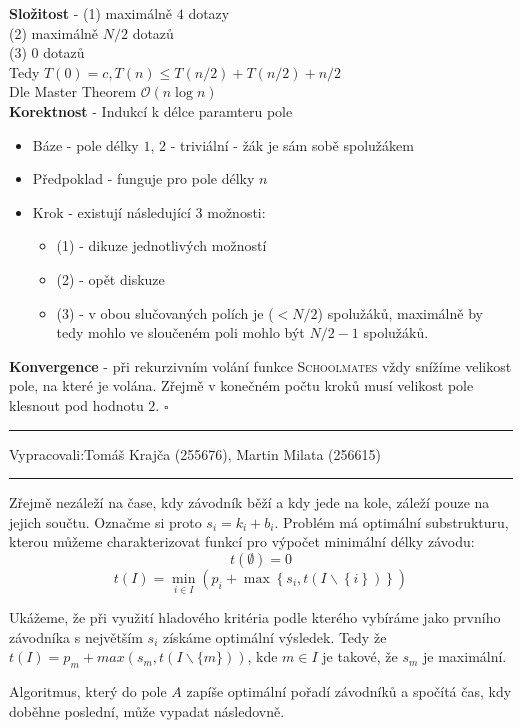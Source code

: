 \documentclass[12pt]{article}
\newcommand{\zadani}[2]{
{\large
\noindent {\bf IB108 \hfill{} Sada #1, Příklad #2 \\[-4mm]}
\noindent\hrule
\vspace{2mm}
\noindent Vypracovali:\hfill{}Tomáš Krajča (255676), Martin Milata (256615)
\vspace{3mm}
\hrule
\bigskip\bigskip}
}
\begin{document}
\noindent
\textbf{Složitost} - (1) maximálně $4$ dotazy\\
                     (2) maximálně $N/2$ dotazů\\
		     (3) $0$ dotazů\\
		     Tedy $T(0) = c, T(n) \leq T(n/2)+T(n/2) + n/2$\\
		     Dle Master Theorem $\mathcal{O}(n\log n)$\\
\textbf{Korektnost} - Indukcí k délce paramteru pole
\begin{itemize}
\item Báze - pole délky $1$, $2$ - triviální - žák je sám sobě spolužákem
\item Předpoklad - funguje pro pole délky $n$
\item Krok - existují následující $3$ možnosti:\begin{itemize}
\item (1) - dikuze jednotlivých možností
\item (2) - opět diskuze
\item (3) - v obou slučovaných polích je ($<N/2$) spolužáků, maximálně by tedy
mohlo ve sloučeném poli mohlo být $N/2-1$ spolužáků.
\end{itemize}
\end{itemize}
\textbf{Konvergence} - při rekurzivním volání funkce \textsc{Schoolmates} vždy
snížíme velikost pole, na které je volána. Zřejmě v konečném počtu kroků musí
velikost pole klesnout pod hodnotu $2$. 
\hfill$\square$


\clearpage
\zadani{2}{2}


\noindent
Zřejmě nezáleží na čase, kdy závodník běží a kdy jede na kole, záleží pouze na jejich součtu.
Označme si proto $s_i = k_i + b_i$.  Problém má optimální substrukturu, kterou můžeme
charakterizovat funkcí pro výpočet minimální délky závodu:
$$t(\emptyset) = 0$$
$$t(I) = 
\min_{i \in I} \left(
		p_i + \max \left\{
				s_i, t(I\smallsetminus\left\{i\right\})
		\right\}
\right)$$

Ukážeme, že při využití hladového kritéria podle kterého vybíráme jako prvního závodníka s největším
$s_i$ získáme optimální výsledek. Tedy že $t(I) = p_m + max(s_m, t(I \smallsetminus \{m\}))$, kde $m
\in I$ je takové, že $s_m$ je maximální.

Algoritmus, který do pole $A$ zapíše optimální pořadí závodníků a spočítá čas, kdy doběhne poslední,
může vypadat následovně.
\end{document}
